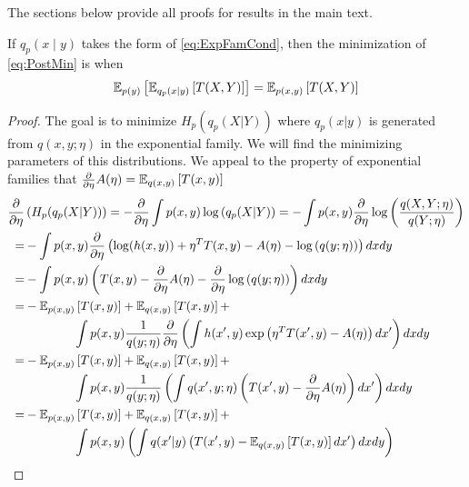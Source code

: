 The sections below provide all proofs for results in the main text.

\renewcommand\thetheorem{4.3}
\begin{lemma}
    If $q_p(x\mid y)$ takes the form of \EQN\eqref{eq:ExpFamCond}, then the minimization
    of \EQN\eqref{eq:PostMin} is when
    \begin{equation}
      \mathbb{E}_{p(y)}\left[\mathbb{E}_{q_p(x\mid y)}\left[T(X,Y)\right]\right]=\mathbb{E}_{p(x,y)}\left[T(X,Y)\right]
    \end{equation}
  \end{lemma}
\begin{proof}
    The goal is to minimize $H_p(q_p(X|Y))$ where $q_p(x|y)$ is 
    generated from $q(x,y;\eta)$ in the exponential family. We will find the 
    minimizing parameters of this distributions. We appeal to the property of 
    exponential families that $\frac{\partial}{\partial\eta}A(\eta)=\mathbb{E}_{q(x,y)}\left[T(x,y)\right]$
    \begin{align}
        \dfrac{\partial}{\partial\eta}&\left(H_p(q_p(X|Y))\right)=
        -\dfrac{\partial}{\partial\eta}\int p(x,y)\log\left(q_p(X|Y)\right)=-\int p(x,y)\dfrac{\partial}{\partial\eta}\log\left(\dfrac{q(X,Y;\eta)}{q(Y;\eta)}\right)\\
        =&-\int p(x,y)\dfrac{\partial}{\partial\eta}\left(\log(h(x,y))
          +\eta^TT(x,y)-A(\eta)-\log\left(q(y;\eta)\right)\right)dxdy           \\
        =&-\int p(x,y)\left(T(x,y)-\dfrac{\partial}{\partial\eta}A(\eta)-\dfrac{\partial}{\partial\eta}\log\left(q(y;\eta)\right)\right)dxdy\\
        =&-\E_{p(x,y)}\left[T(x,y)\right]+\E_{q(x,y)}\left[T(x,y)\right]+
        \notag \\
        &\qquad \qquad \int p(x,y)\dfrac{1}{q(y;\eta)}\dfrac{\partial}{\partial\eta}\left(\int h(x',y)\exp\left(\eta^TT(x',y)-A(\eta)\right)dx'\right)dxdy\\
        =&-\E_{p(x,y)}\left[T(x,y)\right]+\E_{q(x,y)}\left[T(x,y)\right]+
        \notag \\
        &\qquad \qquad \int p(x,y)\dfrac{1}{q(y;\eta)}\left(\int q(x',y;\eta)\left(T(x',y)-\dfrac{\partial}{\partial\eta}A(\eta)\right)dx'\right)dxdy\\
        =&-\E_{p(x,y)}\left[T(x,y)\right]+\E_{q(x,y)}\left[T(x,y)\right]+
        \notag \\
        &\qquad\qquad \int p(x,y)\left(\int q(x'|y)\left(T(x',y)-\E_{q(x,y)}\left[T(x,y)\right]dx'\right)dxdy\right)\\

\end{align}
\end{proof}
